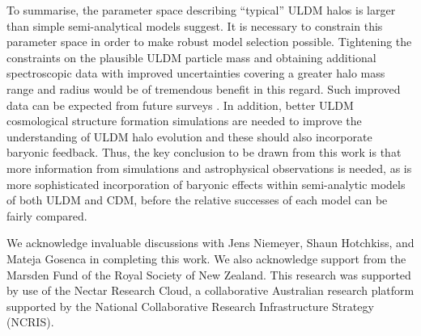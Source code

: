 \documentclass{pasa}%
\begin{document}
To summarise, the parameter space describing ``typical'' ULDM halos is larger than simple semi-analytical models suggest. It is necessary to constrain this parameter space in order to make robust model selection possible. Tightening the constraints on the plausible ULDM particle mass \cite{Castellano:2019hdd, Lidz:2018fqo, Davoudiasl:2019nlo} and obtaining additional spectroscopic data with improved uncertainties covering a greater halo mass range and radius would be of tremendous benefit in this regard. Such improved data can be expected from future surveys \cite{Simon:2019kmm}. In addition, better ULDM cosmological structure formation simulations are needed to  improve the understanding of ULDM halo evolution \cite{Lin:2018whl, Clough:2018exo, Mocz:2015sda} and these should also incorporate baryonic feedback. Thus, the key conclusion to be drawn from this work is that more information from simulations and astrophysical observations is needed, as is more sophisticated incorporation of baryonic effects within semi-analytic models of both ULDM and CDM, before the relative successes of each model can be fairly compared.



\begin{acknowledgements}
We acknowledge invaluable discussions with Jens Niemeyer, Shaun Hotchkiss, and Mateja Gosenca in completing this work. We also acknowledge support from the Marsden Fund of the Royal Society of New Zealand. This research was supported by use of the Nectar Research Cloud, a collaborative Australian research platform supported by the National Collaborative Research Infrastructure Strategy (NCRIS).

\end{acknowledgements}
\end{document}

